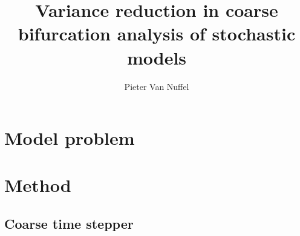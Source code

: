\documentclass[]{article}
\title{Variance reduction in coarse bifurcation analysis of stochastic models}
\author{Pieter Van Nuffel}
\theoremstyle{definition}
\begin{document}
 
\section{Model problem}




\section{Method}
\subsection{Coarse time stepper}



%
%
%
\end{document}
